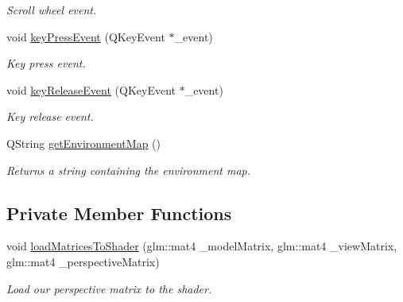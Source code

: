 \begin{DoxyCompactItemize}
\begin{DoxyCompactList}\small\item\em Scroll wheel event. \end{DoxyCompactList}\item 
\hypertarget{class_open_g_l_widget_a2e7ec0372fb6b2a0eb85a9524cfdd7fd}{void \hyperlink{class_open_g_l_widget_a2e7ec0372fb6b2a0eb85a9524cfdd7fd}{key\-Press\-Event} (Q\-Key\-Event $\ast$\-\_\-event)}\label{class_open_g_l_widget_a2e7ec0372fb6b2a0eb85a9524cfdd7fd}

\begin{DoxyCompactList}\small\item\em Key press event. \end{DoxyCompactList}\item 
\hypertarget{class_open_g_l_widget_a7fbffdd8ec3a2ae49882f45ea8ac9951}{void \hyperlink{class_open_g_l_widget_a7fbffdd8ec3a2ae49882f45ea8ac9951}{key\-Release\-Event} (Q\-Key\-Event $\ast$\-\_\-event)}\label{class_open_g_l_widget_a7fbffdd8ec3a2ae49882f45ea8ac9951}

\begin{DoxyCompactList}\small\item\em Key release event. \end{DoxyCompactList}\item 
\hypertarget{class_open_g_l_widget_ab8a2bb0a738df643d8f13efb20395e75}{Q\-String \hyperlink{class_open_g_l_widget_ab8a2bb0a738df643d8f13efb20395e75}{get\-Environment\-Map} ()}\label{class_open_g_l_widget_ab8a2bb0a738df643d8f13efb20395e75}

\begin{DoxyCompactList}\small\item\em Returns a string containing the environment map. \end{DoxyCompactList}\end{DoxyCompactItemize}
\subsection*{Private Member Functions}
\begin{DoxyCompactItemize}
\item 
\hypertarget{class_open_g_l_widget_a965f1a682687f97b47ec5cf599a0b850}{void \hyperlink{class_open_g_l_widget_a965f1a682687f97b47ec5cf599a0b850}{load\-Matrices\-To\-Shader} (glm\-::mat4 \-\_\-model\-Matrix, glm\-::mat4 \-\_\-view\-Matrix, glm\-::mat4 \-\_\-perspective\-Matrix)}\label{class_open_g_l_widget_a965f1a682687f97b47ec5cf599a0b850}

\begin{DoxyCompactList}\small\item\em Load our perspective matrix to the shader. \end{DoxyCompactList}\end{DoxyCompactItemize}
